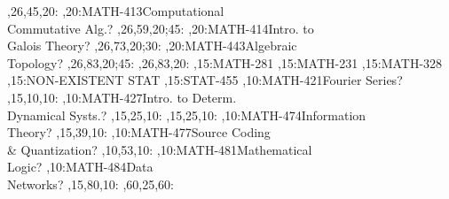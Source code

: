 \documentclass{article}
\begin{document}
\begin{chart}
  ,26,45,20:
,20:{MATH-413}{Computational\\Commutative Alg.}{?}
  ,26,59,20;45:
,20:{MATH-414}{Intro. to\\Galois Theory}{?}
  ,26,73,20;30:
,20:{MATH-443}{Algebraic\\Topology}{?}
  ,26,83,20;45:
  ,26,83,20:
,15:{MATH-281}
,15:{MATH-231}
,15:{MATH-328}
,15:{NON-EXISTENT STAT}
,15:{STAT-455}
,10:{MATH-421}{Fourier Series}{?}
  ,15,10,10:
,10:{MATH-427}{Intro. to Determ.\\Dynamical Systs.}{?}
  ,15,25,10:
  ,15,25,10:
,10:{MATH-474}{Information\\Theory}{?}
  ,15,39,10:
,10:{MATH-477}{Source Coding\\\& Quantization}{?}
  ,10,53,10:
,10:{MATH-481}{Mathematical\\Logic}{?}
,10:{MATH-484}{Data\\Networks}{?}
  ,15,80,10:
  ,60,25,60:
\end{chart}
\end{document}
